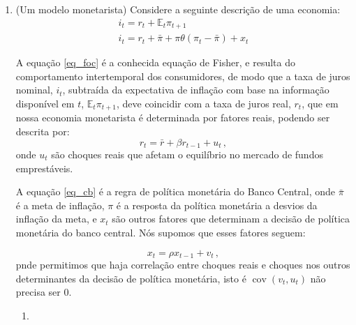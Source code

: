 \documentclass[10pt,a4paper]{article}
\begin{document}
\begin{enumerate}
\begin{enumerate}
	\end{enumerate}
\item (Um modelo monetarista) Considere a seguinte descrição de uma economia:
\begin{align}
	i_t = r_t +\mathbb{E}_t \pi_{t+1} \label{eq_foc} \\
	i_t = r_t + \bar\pi +  \pi \theta (\pi_t - \bar{\pi}) + x_t  \label{eq_cb}
\end{align}

A equação \eqref{eq_foc} é a conhecida equação de Fisher, e resulta do comportamento intertemporal dos consumidores, de modo que a taxa de juros nominal, $i_t$, subtraída da expectativa de inflação com base na informação disponível em $t$, $\mathbb{E}_t \pi_{t+1}$, deve coincidir com a taxa de juros real, $r_t$, que em nossa economia monetarista é determinada por fatores reais, podendo ser descrita por:
\begin{equation}
r_t = \bar{r} + \beta r_{t-1} + u_t \, ,
\end{equation}
onde $u_t$ são choques reais que afetam o equilíbrio no mercado de fundos emprestáveis.

A equação \eqref{eq_cb} é a regra de política monetária do Banco Central, onde $\bar \pi$ é a meta de inflação, $\pi$ é a resposta da política monetária a desvios da inflação da meta, e $x_t$ são outros fatores que determinam a decisão de política monetária do banco central. Nós supomos que esses fatores seguem:
 
 \begin{equation}
 	x_t =  \rho x_{t-1} + v_t \, ,
 \end{equation}
pnde permitimos que haja correlação entre choques reais e choques nos outros determinantes da decisão de política monetária, isto é $\operatorname{cov}(v_t,u_t)$ não precisa ser $0$.

\begin{enumerate}
	\item 
\end{enumerate}
\end{enumerate}
\end{document}
